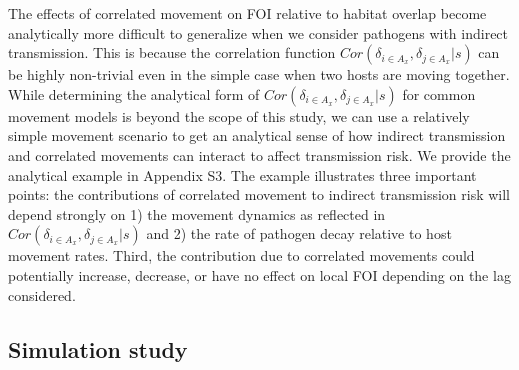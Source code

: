 \documentclass[letterpaper]{article}
\begin{document}
The effects of correlated movement on FOI relative to habitat overlap become analytically more difficult to generalize when we consider pathogens with indirect transmission.  This is because the correlation function $Cor(\delta_{i \in A_x}, \delta_{j \in A_x} | s)$ can be highly non-trivial even in the simple case when two hosts are moving together.  
While determining the analytical form of $Cor(\delta_{i \in A_x}, \delta_{j \in A_x} | s)$ for common movement models is beyond the scope of this study, we can use a relatively simple movement scenario to get an analytical sense of how indirect transmission and correlated movements can interact to affect transmission risk.  We provide the analytical example in Appendix S3. The example illustrates three important points: the contributions of correlated movement to indirect transmission risk will depend strongly on 1) the movement dynamics as reflected in $Cor(\delta_{i \in A_x}, \delta_{j \in A_x} | s)$ and 2) the rate of pathogen decay relative to host movement rates.  Third, the contribution due to correlated movements could potentially increase, decrease, or have no effect on local FOI depending on the lag considered.  


\subsection*{Simulation study}
\end{document}
